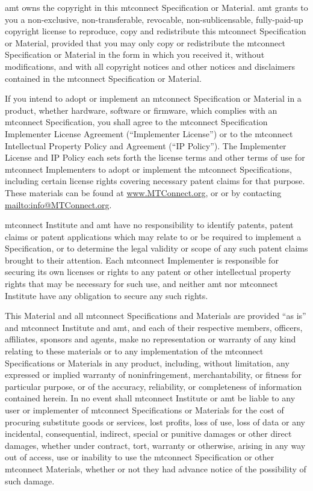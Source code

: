 \gls{amt} owns the copyright in this \gls{mtconnect} Specification or Material. \gls{amt} grants to you a non-exclusive, non-transferable, revocable, non-sublicensable, fully-paid-up copyright license to reproduce, copy and redistribute this \gls{mtconnect} Specification or Material, provided that you may only copy or redistribute the \gls{mtconnect} Specification or Material in the form in which you received it, without modifications, and with all copyright notices and other notices and disclaimers contained in the \gls{mtconnect} Specification or Material.

If you intend to adopt or implement an \gls{mtconnect} Specification or Material in a product, whether hardware, software or firmware, which complies with an \gls{mtconnect} Specification, you shall agree to the \gls{mtconnect} Specification Implementer License Agreement (``Implementer License'') or to the \gls{mtconnect} Intellectual Property Policy and Agreement (``IP Policy''). The Implementer License and IP Policy each sets forth the license terms and other terms of use for \gls{mtconnect} Implementers to adopt or implement the \gls{mtconnect} Specifications, including certain license rights covering necessary patent claims for that purpose. These materials can be found at \url{www.MTConnect.org}, or or by contacting \url{mailto:info@MTConnect.org}. 

\gls{mtconnect} Institute and \gls{amt} have no responsibility to identify patents, patent claims or patent applications which may relate to or be required to implement a Specification, or to determine the legal validity or scope of any such patent claims brought to their attention. Each \gls{mtconnect} Implementer is responsible for securing its own licenses or rights to any patent or other intellectual property rights that may be necessary for such use, and neither \gls{amt} nor \gls{mtconnect} Institute have any obligation to secure any such rights.

This Material and all \gls{mtconnect} Specifications and Materials are provided ``as is'' and \gls{mtconnect} Institute and \gls{amt}, and each of their respective members, officers, affiliates, sponsors and agents, make no representation or warranty of any kind relating to these materials or to any implementation of the \gls{mtconnect} Specifications or Materials in any product, including, without limitation, any expressed or implied warranty of noninfringement, merchantability, or fitness for particular purpose, or of the accuracy, reliability, or completeness of information contained herein. In no event shall \gls{mtconnect} Institute or \gls{amt} be liable to any user or implementer of \gls{mtconnect} Specifications or Materials for the cost of procuring substitute goods or services, lost profits, loss of use, loss of data or any incidental, consequential, indirect, special or punitive damages or other direct damages, whether under contract, tort, warranty or otherwise, arising in any way out of access, use or inability to use the \gls{mtconnect} Specification or other \gls{mtconnect} Materials, whether or not they had advance notice of the possibility of such damage.
